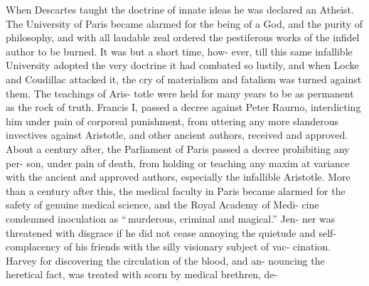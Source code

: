 \documentclass[10pt]{article}
\begin{document}
\begin{multicols}{3}
	When Descartes taught the doctrine of innate ideas he was declared an\linebreak
	Atheist. The University of Paris became alarmed for the being of a God, and\linebreak
	the purity of philosophy, and with all laudable zeal ordered the pestiferous\linebreak
	works of the infidel author to be burned. It was but a short time, how-\linebreak
	ever, till this same infallible University adopted the very doctrine it had\linebreak
	combated so lustily, and when Locke and Coudillac attacked it, the cry of\linebreak
	materialism and fatalism was turned against them. The teachings of Aris-\linebreak
	totle were held for many years to be as permanent as the rock of truth.\linebreak
	Francis I, passed a decree against Peter Raurno, interdicting him under\linebreak
	pain of corporeal punishment, from uttering any more slanderous invectives\linebreak
	against Aristotle, and other ancient authors, received and approved. About\linebreak
	a century after, the Parliament of Paris passed a decree prohibiting any per-\linebreak
	son, under pain of death, from holding or teaching any maxim at variance\linebreak
	with the ancient and approved authors, especially the infallible Aristotle.\linebreak
	More than a century after this, the medical faculty in Paris became alarmed\linebreak
	for the safety of genuine medical science, and the Royal Academy of Medi-\linebreak
	cine condemned inoculation as ``\,murderous, criminal and magical.'' Jen-\linebreak
	ner was threatened with disgrace if he did not cease annoying the quietude\linebreak
	and self-complacency of his friends with the silly visionary subject of vac-\linebreak
	cination. Harvey for discovering the circulation of the blood, and an-\linebreak
	nouncing the heretical fact, was treated with scorn by medical brethren, de-\linebreak

\end{multicols}
\end{document}
